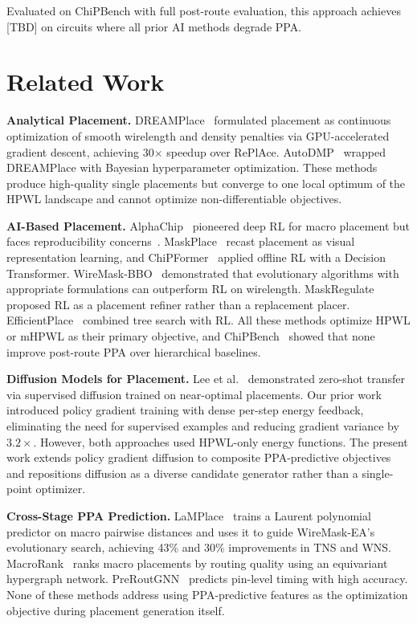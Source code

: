 \documentclass[sigconf,anonymous,review,9pt]{acmart}
\begin{document}
Evaluated on ChiPBench with full post-route evaluation, this approach
achieves [TBD] on circuits where all prior AI methods degrade PPA.


\section{Related Work}
\label{sec:related}

\textbf{Analytical Placement.}
DREAMPlace~\cite{lin2019dreamplace} formulated placement as continuous
optimization of smooth wirelength and density penalties via
GPU-accelerated gradient descent, achieving 30$\times$ speedup over
RePlAce. AutoDMP~\cite{autodmp2023} wrapped DREAMPlace with Bayesian
hyperparameter optimization. These methods produce high-quality single
placements but converge to one local optimum of the HPWL landscape and
cannot optimize non-differentiable objectives.

\textbf{AI-Based Placement.}
AlphaChip~\cite{mirhoseini2021graph} pioneered deep RL for macro
placement but faces reproducibility
concerns~\cite{kahng2023reevaluating}. MaskPlace~\cite{lai2022maskplace}
recast placement as visual representation learning, and
ChiPFormer~\cite{lai2023chipformer} applied offline RL with a Decision
Transformer. WireMask-BBO~\cite{shi2023wire} demonstrated that
evolutionary algorithms with appropriate formulations can outperform RL
on wirelength. MaskRegulate~\cite{maskregulate2024} proposed RL as a
placement refiner rather than a replacement placer.
EfficientPlace~\cite{efficientplace2024} combined tree search with RL.
All these methods optimize HPWL or mHPWL as their primary objective, and
ChiPBench~\cite{chipbench2025} showed that none improve post-route PPA
over hierarchical baselines.

\textbf{Diffusion Models for Placement.}
Lee et al.~\cite{lee2024chip} demonstrated zero-shot transfer via
supervised diffusion trained on near-optimal placements. Our prior
work~\cite{chen2026dac} introduced policy gradient training with dense
per-step energy feedback, eliminating the need for supervised examples
and reducing gradient variance by $3.2\times$. However, both approaches
used HPWL-only energy functions. The present work extends policy
gradient diffusion to composite PPA-predictive objectives and
repositions diffusion as a diverse candidate generator rather than a
single-point optimizer.

\textbf{Cross-Stage PPA Prediction.}
LaMPlace~\cite{lamplace2025} trains a Laurent polynomial predictor on
macro pairwise distances and uses it to guide WireMask-EA's
evolutionary search, achieving 43\% and 30\% improvements in TNS and
WNS. MacroRank~\cite{macrorank2023} ranks macro placements by routing
quality using an equivariant hypergraph network.
PreRoutGNN~\cite{preroutgnn2024} predicts pin-level timing with high
accuracy. None of these methods address using PPA-predictive features as
the optimization objective during placement generation itself.
\end{document}
